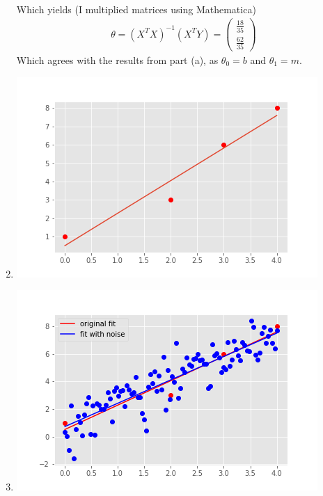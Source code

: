 \documentclass[12pt,letterpaper]{hmcpset}
\begin{document}
\begin{solution}
\begin{enumerate}
\begin{align*}
    \end{align*}
   Which yields (I multiplied matrices using Mathematica)
    \begin{align*}
        \theta = (X^TX)^{-1}(X^{T}Y) = \begin{pmatrix} \frac{18}{35} \\ \frac{62}{35} \end{pmatrix}
    \end{align*}
    Which agrees with the results from part (a), as $\theta_0 = b$ and $\theta_1 = m$.
    \item
    \includegraphics[]{hw1pr2c.png}
    \item 
    \includegraphics[]{hw1pr2d.png}
\end{enumerate}
    \vfill
\end{solution}
\newpage
\end{document}
